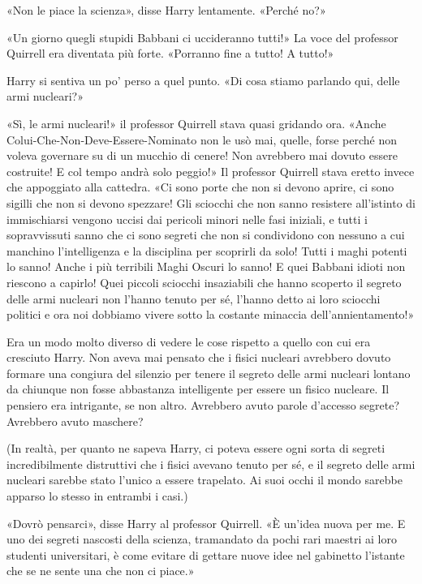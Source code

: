 «Non le piace la scienza», disse Harry lentamente. «Perché no?»

«Un giorno quegli stupidi Babbani ci uccideranno tutti!» La voce del professor Quirrell era diventata più forte. «Porranno fine a tutto! A tutto!»

Harry si sentiva un po’ perso a quel punto. «Di cosa stiamo parlando qui, delle armi nucleari?»

«Sì, le armi nucleari!» il professor Quirrell stava quasi gridando ora. «Anche Colui-Che-Non-Deve-Essere-Nominato non le usò mai, quelle, forse perché non voleva governare su di un mucchio di cenere! Non avrebbero mai dovuto essere costruite! E col tempo andrà solo peggio!» Il professor Quirrell stava eretto invece che appoggiato alla cattedra. «Ci sono porte che non si devono aprire, ci sono sigilli che non si devono spezzare! Gli sciocchi che non sanno resistere all’istinto di immischiarsi vengono uccisi dai pericoli minori nelle fasi iniziali, e tutti i sopravvissuti sanno che ci sono segreti che non si condividono con nessuno a cui manchino l’intelligenza e la disciplina per scoprirli da solo! Tutti i maghi potenti lo sanno! Anche i più terribili Maghi Oscuri lo sanno! E quei Babbani idioti non riescono a capirlo! Quei piccoli sciocchi insaziabili che hanno scoperto il segreto delle armi nucleari non l’hanno tenuto per sé, l’hanno detto ai loro sciocchi politici e ora noi dobbiamo vivere sotto la costante minaccia dell’annientamento!»

Era un modo molto diverso di vedere le cose rispetto a quello con cui era cresciuto Harry. Non aveva mai pensato che i fisici nucleari avrebbero dovuto formare una congiura del silenzio per tenere il segreto delle armi nucleari lontano da chiunque non fosse abbastanza intelligente per essere un fisico nucleare. Il pensiero era intrigante, se non altro. Avrebbero avuto parole d’accesso segrete? Avrebbero avuto maschere?

(In realtà, per quanto ne sapeva Harry, ci poteva essere ogni sorta di segreti incredibilmente distruttivi che i fisici avevano tenuto per sé, e il segreto delle armi nucleari sarebbe stato l’unico a essere trapelato. Ai suoi occhi il mondo sarebbe apparso lo stesso in entrambi i casi.)

«Dovrò pensarci», disse Harry al professor Quirrell. «È un’idea nuova per me. E uno dei segreti nascosti della scienza, tramandato da pochi rari maestri ai loro studenti universitari, è come evitare di gettare nuove idee nel gabinetto l’istante che se ne sente una che non ci piace.»

